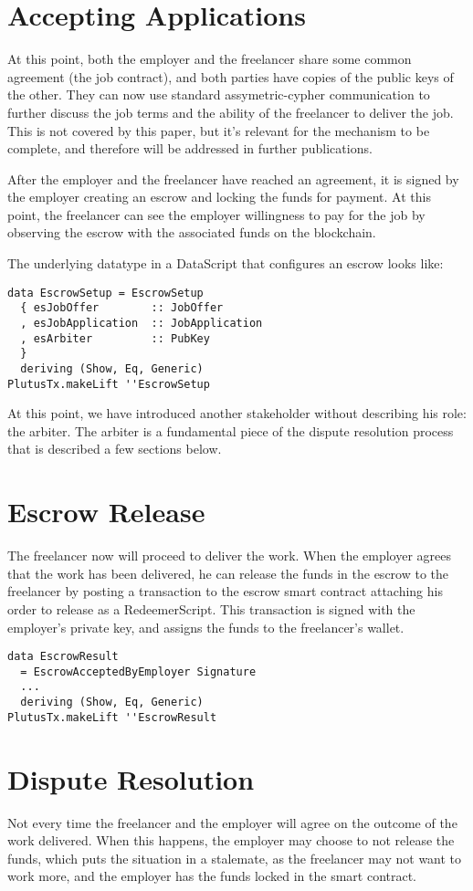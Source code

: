 \documentclass{article}
\begin{document}
\section{Accepting Applications}
At this point, both the employer and the freelancer share some common agreement (the job contract), and both parties have copies of the public keys of the other. They can now use standard assymetric-cypher communication to further discuss the job terms and the ability of the freelancer to deliver the job. This is not covered by this paper, but it's relevant for the mechanism to be complete, and therefore will be addressed in further publications.

After the employer and the freelancer have reached an agreement, it is signed by the employer creating an escrow and locking the funds for payment. At this point, the freelancer can see the employer willingness to pay for the job by observing the escrow with the associated funds on the blockchain.

The underlying datatype in a DataScript that configures an escrow looks like:
\begin{verbatim}
data EscrowSetup = EscrowSetup
  { esJobOffer        :: JobOffer
  , esJobApplication  :: JobApplication
  , esArbiter         :: PubKey
  }
  deriving (Show, Eq, Generic)
PlutusTx.makeLift ''EscrowSetup
\end{verbatim}

At this point, we have introduced another stakeholder without describing his role: the arbiter. The arbiter is a fundamental piece of the dispute resolution process that is described a few sections below.

\section{Escrow Release}
The freelancer now will proceed to deliver the work. When the employer agrees that the work has been delivered, he can release the funds in the escrow to the freelancer by posting a transaction to the escrow smart contract attaching his order to release as a RedeemerScript. This transaction is signed with the employer's private key, and assigns the funds to the freelancer's wallet.

\begin{verbatim}
data EscrowResult
  = EscrowAcceptedByEmployer Signature
  ...
  deriving (Show, Eq, Generic)
PlutusTx.makeLift ''EscrowResult
\end{verbatim}


\section{Dispute Resolution}
Not every time the freelancer and the employer will agree on the outcome of the work delivered. When this happens, the employer may choose to not release the funds, which puts the situation in a stalemate, as the freelancer may not want to work more, and the employer has the funds locked in the smart contract.
\end{document}
